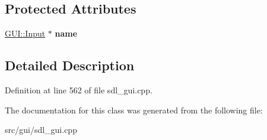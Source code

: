 \subsection*{Protected Attributes}
\begin{DoxyCompactItemize}
\item 
\hypertarget{classSaveDialog_a112cebb10bd8304b2eaf491beded0abb}{\hyperlink{classGUI_1_1Input}{G\-U\-I\-::\-Input} $\ast$ {\bfseries name}}\label{classSaveDialog_a112cebb10bd8304b2eaf491beded0abb}

\end{DoxyCompactItemize}


\subsection{Detailed Description}


Definition at line 562 of file sdl\-\_\-gui.\-cpp.



The documentation for this class was generated from the following file\-:\begin{DoxyCompactItemize}
\item 
src/gui/sdl\-\_\-gui.\-cpp\end{DoxyCompactItemize}
